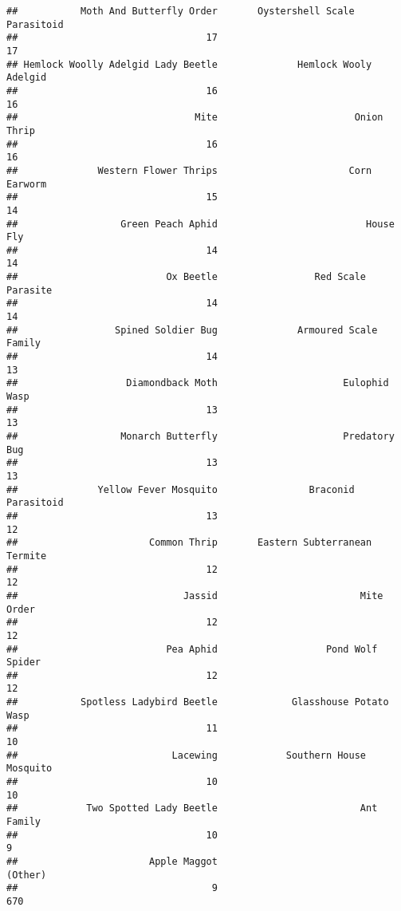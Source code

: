\documentclass[]{article}
\begin{document}
\begin{verbatim}
##           Moth And Butterfly Order       Oystershell Scale Parasitoid 
##                                 17                                 17 
## Hemlock Woolly Adelgid Lady Beetle              Hemlock Wooly Adelgid 
##                                 16                                 16 
##                               Mite                        Onion Thrip 
##                                 16                                 16 
##              Western Flower Thrips                       Corn Earworm 
##                                 15                                 14 
##                  Green Peach Aphid                          House Fly 
##                                 14                                 14 
##                          Ox Beetle                 Red Scale Parasite 
##                                 14                                 14 
##                 Spined Soldier Bug              Armoured Scale Family 
##                                 14                                 13 
##                   Diamondback Moth                      Eulophid Wasp 
##                                 13                                 13 
##                  Monarch Butterfly                      Predatory Bug 
##                                 13                                 13 
##              Yellow Fever Mosquito                Braconid Parasitoid 
##                                 13                                 12 
##                       Common Thrip       Eastern Subterranean Termite 
##                                 12                                 12 
##                             Jassid                         Mite Order 
##                                 12                                 12 
##                          Pea Aphid                   Pond Wolf Spider 
##                                 12                                 12 
##           Spotless Ladybird Beetle             Glasshouse Potato Wasp 
##                                 11                                 10 
##                           Lacewing            Southern House Mosquito 
##                                 10                                 10 
##            Two Spotted Lady Beetle                         Ant Family 
##                                 10                                  9 
##                       Apple Maggot                            (Other) 
##                                  9                                670
\end{verbatim}
\end{document}
